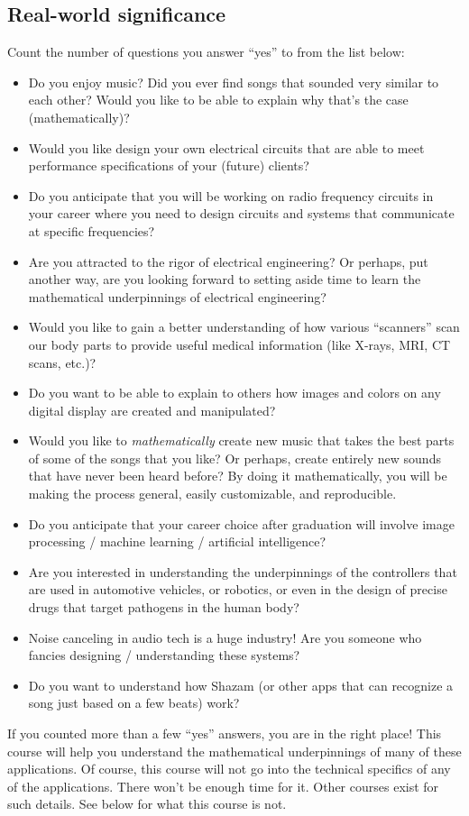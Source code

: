 \documentclass{ee102_notes}
\begin{document}
\subsection{Real-world significance}
Count the number of questions you answer ``yes'' to from the list below:
\begin{itemize}
  \item Do you enjoy music? Did you ever find songs that sounded very similar to each other? Would you like to be able to explain why that's the case (mathematically)?
  \item Would you like design your own electrical circuits that are able to meet performance specifications of your (future) clients?
  \item Do you anticipate that you will be working on radio frequency circuits in your career where you need to design circuits and systems that communicate at specific frequencies?
  \item Are you attracted to the rigor of electrical engineering? Or perhaps, put another way, are you looking forward to setting aside time to learn the mathematical underpinnings of electrical engineering?
  \item Would you like to gain a better understanding of how various ``scanners'' scan our body parts to provide useful medical information (like X-rays, MRI, CT scans, etc.)?
  \item Do you want to be able to explain to others how images and colors on any digital display are created and manipulated?
  \item Would you like to \emph{mathematically} create new music that takes the best parts of some of the songs that you like? Or perhaps, create entirely new sounds that have never been heard before? By doing it mathematically, you will be making the process general, easily customizable, and reproducible.
  \item Do you anticipate that your career choice after graduation will involve image processing / machine learning / artificial intelligence?
  \item Are you interested in understanding the underpinnings of the controllers that are used in automotive vehicles, or robotics, or even in the design of precise drugs that target pathogens in the human body?
  \item Noise canceling in audio tech is a huge industry! Are you someone who fancies designing / understanding these systems?
  \item Do you want to understand how Shazam (or other apps that can recognize a song just based on a few beats) work?
\end{itemize}
If you counted more than a few ``yes'' answers, you are in the right place! This course will help you understand the mathematical underpinnings of many of these applications. Of course, this course will not go into the technical specifics of any of the applications. There won't be enough time for it. Other courses exist for such details. See below for what this course is not.
\end{document}
